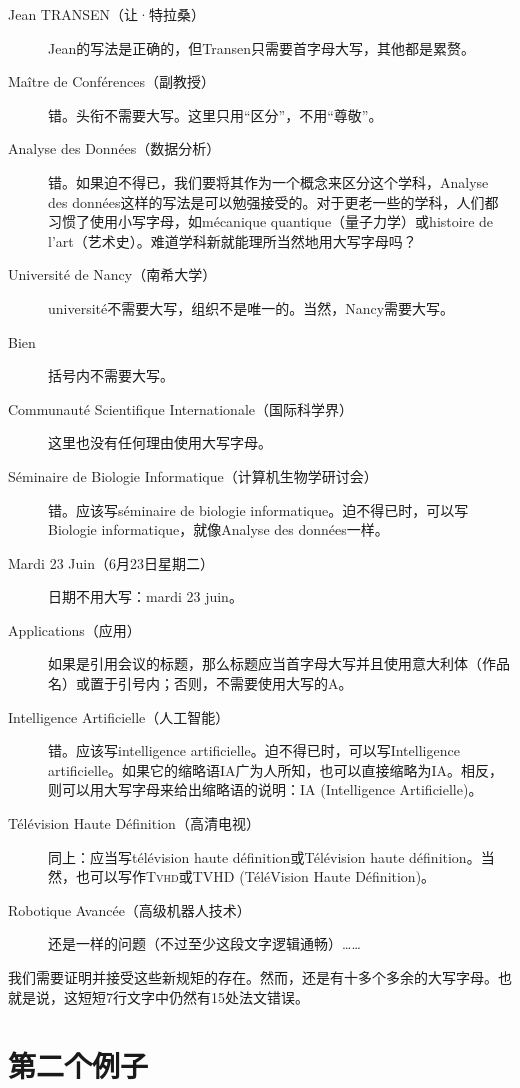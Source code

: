 \begin{description}
    \item[Jean TRANSEN（让·特拉桑）] Jean的写法是正确的，但Transen只需要首字母大写，其他都是累赘。
    \item[Maître de Conférences（副教授）] 错。头衔不需要大写。这里只用``区分''，不用``尊敬''。
    \item[Analyse des Données（数据分析）] 错。如果迫不得已，我们要将其作为一个概念来区分这个学科，Analyse des données这样的写法是可以勉强接受的。对于更老一些的学科，人们都习惯了使用小写字母，如mécanique quantique（量子力学）或histoire de l'art（艺术史）。难道学科新就能理所当然地用大写字母吗？
    \item[Université de Nancy（南希大学）] université不需要大写，组织不是唯一的。当然，Nancy需要大写。
    \item[Bien] 括号内不需要大写。
    \item[Communauté Scientifique Internationale（国际科学界）] 这里也没有任何理\linebreak 由使用大写字母。
    \item[Séminaire de Biologie Informatique（计算机生物学研讨会）] 错。应该写séminaire de biologie informatique。迫不得已时，可以写Biologie informatique，就像Analyse des données一样。
    \item[Mardi 23 Juin（6月23日星期二）] 日期不用大写：mardi 23 juin。
    \item[Applications（应用）] 如果是引用会议的标题，那么标题应当首字母大写并且使用意大利体（作品名）或置于引号内；否则，不需要使用大写的A。
    \item[Intelligence Artificielle（人工智能）] 错。应该写intelligence artificielle。迫不得已时，可以写Intelligence artificielle。如果它的缩略语IA广为人所知，也可以直接缩略为IA。相反，则可以用大写字母来给出缩略语的说明：IA (Intelligence Artificielle)。
    \item[Télévision Haute Définition（高清电视）] 同上：应当写télévision haute définition或Télévision haute définition。当然，也可以写作\textsc{Tvhd}或TVHD (TéléVision Haute Définition)。
    \item[Robotique Avancée（高级机器人技术）] 还是一样的问题（不过至少这段文字逻辑通畅）……
\end{description}

我们需要证明并接受这些新规矩的存在。然而，还是有十多个多余的大写字母。也就是说，这短短7行文字中仍然有15处法文错误。

\section{第二个例子}


